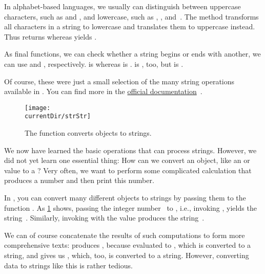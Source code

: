 %
In alphabet-based languages, we usually can distinguish between uppercase characters, such as  and , and lowercase, such as , , and~.
The method  transforms all characters in a string to lowercase and  translates them to uppercase instead.
Thus  returns  whereas  yields .

As final functions, we can check whether a string begins or ends with another, we can use  and , respectively.
 is  whereas  is .
 is , too, but  is .

Of course, these were just a small selection of the many string operations available in \python.
You can find more in the \href{https://docs.python.org/3/library/stdtypes.html\#textseq}{official documentation}~\cite{PSF2024TSTS}.%
\endhsection%
%
%
\label{sec:fstrings}%
%
\begin{figure}%
\centering%
\texttt{[image: \\currentDir/strStr]}%
\caption{The  function converts objects to strings.}%
\label{fig:strStr}%
\end{figure}%
%
We now have learned the basic operations that can process strings.
However, we did not yet learn one essential thing:
How can we convert an object, like an  or  value to a ?
Very often, we want to perform some complicated calculation that produces a number and then print this number.

In \python, you can convert many different objects to strings by passing them to the function .
As \cref{fig:strStr} shows, passing the integer number~ to , i.e., invoking , yields the string~.
Similarly, invoking  with the  value  produces the string~.

We can of course concatenate the results of such computations to form more comprehensive texts:
 produces , because  evaluated to , which is converted to a string, and  gives us , which, too, is converted to a string.
However, converting data to strings like this is rather tedious.


